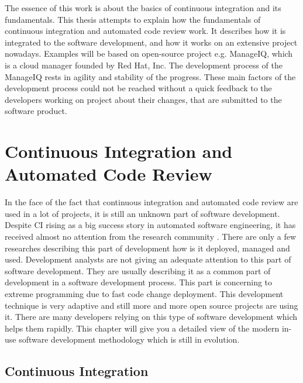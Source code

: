 The essence of this work is about the basics of continuous integration and its fundamentals. This thesis attempts to explain how the fundamentals of continuous integration and automated code review work. It describes how it is integrated to the software development, and how it works on an extensive project nowadays. Examples will be based on open-source project e.g. ManageIQ, which is a cloud manager founded by Red Hat, Inc. The development process of the ManageIQ rests in agility and stability of the progress. These main factors of the development process could not be reached without a quick feedback to the developers working on project about their changes, that are submitted to the software product.

\chapter{Continuous Integration and Automated Code Review}

In the face of the fact that continuous integration and automated code review are used in a lot of projects, it is still an unknown part of software development. Despite CI rising as a big success story in automated software engineering, it has received almost no attention from the research community \cite{COPE}. There are only a few researches describing this part of development how is it deployed, managed and used. Development analysts are not giving an adequate attention to this part of software development. They are usually describing it as a common part of development in a software development process. This part is concerning to extreme programming due to fast code change deployment. This development technique is very adaptive and still more and more open source projects are using it. There are many developers relying on this type of software development which helps them rapidly. This chapter will give you a detailed view of the modern in-use software development methodology which is still in evolution.

\section{Continuous Integration}

